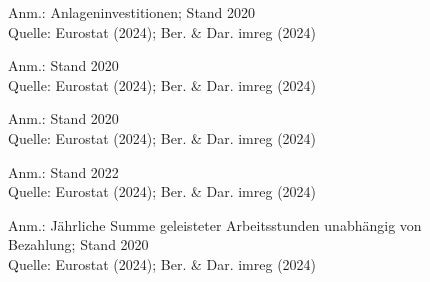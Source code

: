 \begin{figure}[p]
	{\centering {}}
	\label{map:invest}
	\begin{spacing}{1} \scriptsize
		Anm.: Anlageninvestitionen; Stand 2020\\
		Quelle: Eurostat (2024); Ber. \& Dar. imreg (2024) 
	\end{spacing}
\end{figure}


\begin{figure}[p]
	{\centering {}}
	\label{map:unternehmenvg}
	\begin{spacing}{1} \scriptsize
		Anm.: Stand 2020\\
		Quelle: Eurostat (2024); Ber. \& Dar. imreg (2024) 
	\end{spacing}
\end{figure}


\begin{figure}[p]
	{\centering {}}
	\label{map:beschvg}
	\begin{spacing}{1} \scriptsize
		Anm.: Stand 2020\\
		Quelle: Eurostat (2024); Ber. \& Dar. imreg (2024) 
	\end{spacing}
\end{figure}


\begin{figure}[p]
	{\centering {}}
	\label{map:beschanteilvg}
	\begin{spacing}{1} \scriptsize
		Anm.: Stand 2022\\
		Quelle: Eurostat (2024); Ber. \& Dar. imreg (2024) 
	\end{spacing}
\end{figure}


\begin{figure}[p]
	{\centering {}}
	\label{map:stundengeleistetvg}
	\begin{spacing}{1} \scriptsize
		Anm.: Jährliche Summe geleisteter Arbeitsstunden unabhängig von Bezahlung; Stand 2020\\
		Quelle: Eurostat (2024); Ber. \& Dar. imreg (2024) \end{spacing}
\end{figure}


